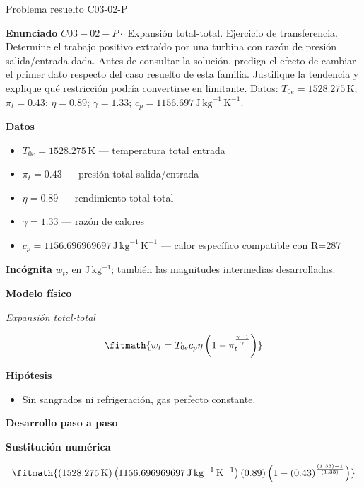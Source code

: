 \documentclass[10pt,openany]{book}
\begin{document}
\begin{studiumworked}{Problema resuelto C03-02-P}


\noindent\textbf{Enunciado}
\(C03-02-P \cdot\) Expansión total-total. Ejercicio de transferencia. Determine el trabajo positivo extraído por una turbina con razón de presión salida/entrada dada. Antes de consultar la solución, prediga el efecto de cambiar el primer dato respecto del caso resuelto de esta familia. Justifique la tendencia y explique qué restricción podría convertirse en limitante. Datos: \(T_{0e}=1528.275\, \mathrm{K}\); \(\pi_t=0.43\); \(\eta=0.89\); \(\gamma=1.33\); \(c_p=1156.697\, \mathrm{J}\,\mathrm{kg}^{-1}\,\mathrm{K}^{-1}\).

\noindent\textbf{Datos}
\begin{itemize}
\item $T_{0e} = 1528.275\,\mathrm{K}$ — temperatura total entrada
\item $\pi_t = 0.43$ — presión total salida/entrada
\item $\eta = 0.89$ — rendimiento total-total
\item $\gamma = 1.33$ — razón de calores
\item $c_p = 1156.696969697\,\mathrm{J}\,\mathrm{kg}^{-1}\,\mathrm{K}^{-1}$ — calor específico compatible con R=287
\end{itemize}

\noindent\textbf{Incógnita}
$w_t$, en $\mathrm{J\,kg^{-1}}$; también las magnitudes intermedias desarrolladas.

\noindent\textbf{Modelo físico}

\noindent\textit{Expansión total-total}

\[
\fitmath{w_t=T_{0e} c_p \eta \left(1 - \pi_t^{\frac{\gamma - 1}{\gamma}}\right)}
\]

\noindent\textbf{Hipótesis}
\begin{itemize}
\item Sin sangrados ni refrigeración, gas perfecto constante.
\end{itemize}

\noindent\textbf{Desarrollo paso a paso}



\noindent\textbf{Sustitución numérica}

\[
\fitmath{\left(1528.275\,\mathrm{K}\right) \left(1156.696969697\,\mathrm{J}\,\mathrm{kg}^{-1}\,\mathrm{K}^{-1}\right) \left(0.89\right) \left(1 - \left(0.43\right)^{\frac{\left(1.33\right) - 1}{\left(1.33\right)}}\right)}
\]


\end{studiumworked}
\end{document}
